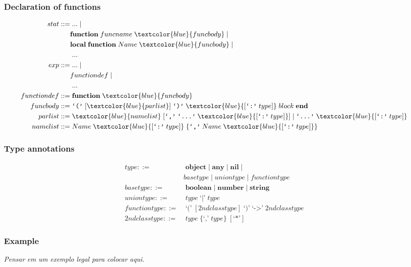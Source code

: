\documentclass{beamer}
\begin{document}
\begin{frame}
\frametitle{Declaration of functions}
\begin{align*}
stat ::= & \; ... \; |\\
& \textbf{function} \; funcname \; \textcolor{blue}{funcbody} \; |\\
& \textbf{local} \; \textbf{function} \; Name \; \textcolor{blue}{funcbody} \; |\\
& \; ... \\
exp ::= & \; ... \; |\\
& functiondef \; |\\
& \; ...\\
functiondef ::= & \; \textbf{function} \; \textcolor{blue}{funcbody}\\
funcbody ::= & \; \texttt{`('} \; [\textcolor{blue}{parlist}] \; \texttt{`)'} \;
\textcolor{blue}{[\texttt{`:'} \; type]} \; block \; \textbf{end}\\
parlist ::= & \; \textcolor{blue}{namelist} \; [\texttt{`,'} \; \texttt{`...'} \;
\textcolor{blue}{[\texttt{`:'} \; type]}] \; | \;
\texttt{`...'} \; \textcolor{blue}{[\texttt{`:'} \; type]}\\
namelist ::= & \; Name \; \textcolor{blue}{[\texttt{`:'} \; type]} \;
\{\texttt{`,'} \; Name \; \textcolor{blue}{[\texttt{`:'} \; type]}\}
\end{align*}
\end{frame}

\begin{frame}
\frametitle{Type annotations}
\begin{align*}
type ::= & \; \textbf{object} \;|\; \textbf{any} \;|\; \textbf{nil} \;|\\
& basetype \;|\; uniontype \;|\; functiontype\\
basetype ::= & \; \textbf{boolean} \;|\; \textbf{number} \;|\; \textbf{string}\\
uniontype ::= & \; type \;\texttt{`|'}\; type\\
functiontype ::= & \; \texttt{`('} \; [2ndclasstype] \; \texttt{`)'} \;
\texttt{`->'} \; 2ndclasstype\\
2ndclasstype ::= & \; type \; \{\texttt{`,'} \; type\} \; [\texttt{`*'}]
\end{align*}
\end{frame}

\begin{frame}
\frametitle{Example}
\textit{Pensar em um exemplo legal para colocar aqui.}
\end{frame}
\end{document}
